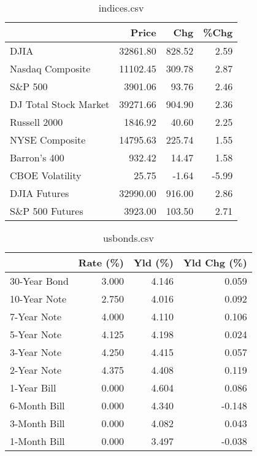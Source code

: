 \documentclass{article}%
\begin{document}
%


\begin{table}[htbp]%
\caption{indices.csv}%
\centering%
\begin{adjustbox}{width=1\textwidth}%
\begin{tabular}{lrrr}
\toprule
                      &    Price &    Chg &  \%Chg \\
\midrule
                 DJIA & 32861.80 & 828.52 &  2.59 \\
     Nasdaq Composite & 11102.45 & 309.78 &  2.87 \\
              S\&P 500 &  3901.06 &  93.76 &  2.46 \\
DJ Total Stock Market & 39271.66 & 904.90 &  2.36 \\
         Russell 2000 &  1846.92 &  40.60 &  2.25 \\
       NYSE Composite & 14795.63 & 225.74 &  1.55 \\
         Barron's 400 &   932.42 &  14.47 &  1.58 \\
      CBOE Volatility &    25.75 &  -1.64 & -5.99 \\
         DJIA Futures & 32990.00 & 916.00 &  2.86 \\
      S\&P 500 Futures &  3923.00 & 103.50 &  2.71 \\
\bottomrule
\end{tabular}
%
\end{adjustbox}%
\end{table}

%


\begin{table}[htbp]%
\caption{usbonds.csv}%
\centering%
\begin{adjustbox}{width=1\textwidth}%
\begin{tabular}{lrrr}
\toprule
             &  Rate (\%) &  Yld (\%) &  Yld Chg (\%) \\
\midrule
30-Year Bond &     3.000 &    4.146 &        0.059 \\
10-Year Note &     2.750 &    4.016 &        0.092 \\
 7-Year Note &     4.000 &    4.110 &        0.106 \\
 5-Year Note &     4.125 &    4.198 &        0.024 \\
 3-Year Note &     4.250 &    4.415 &        0.057 \\
 2-Year Note &     4.375 &    4.408 &        0.119 \\
 1-Year Bill &     0.000 &    4.604 &        0.086 \\
6-Month Bill &     0.000 &    4.340 &       -0.148 \\
3-Month Bill &     0.000 &    4.082 &        0.043 \\
1-Month Bill &     0.000 &    3.497 &       -0.038 \\
\bottomrule
\end{tabular}
%
\end{adjustbox}%
\end{table}
\end{document}

